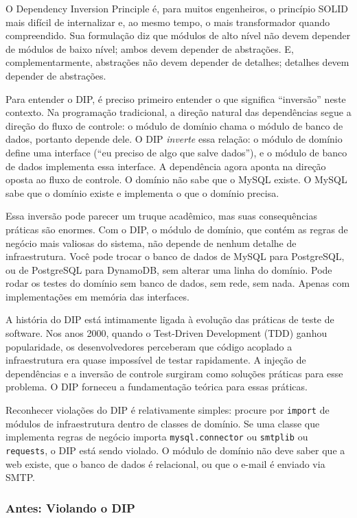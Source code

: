 O Dependency Inversion Principle é, para muitos engenheiros, o princípio SOLID
mais difícil de internalizar e, ao mesmo tempo, o mais transformador quando
compreendido. Sua formulação diz que módulos de alto nível não devem
depender de módulos de baixo nível; ambos devem depender de abstrações. E,
complementarmente, abstrações não devem depender de detalhes; detalhes devem
depender de abstrações.

Para entender o DIP, é preciso primeiro entender o que significa ``inversão''
neste contexto. Na programação tradicional, a direção natural das dependências
segue a direção do fluxo de controle: o módulo de domínio chama o módulo de
banco de dados, portanto depende dele. O DIP \emph{inverte} essa relação: o
módulo de domínio define uma interface (``eu preciso de algo que salve dados''),
e o módulo de banco de dados implementa essa interface. A dependência agora
aponta na direção oposta ao fluxo de controle. O domínio não sabe que o MySQL
existe. O MySQL sabe que o domínio existe e implementa o que o domínio precisa.

Essa inversão pode parecer um truque acadêmico, mas suas consequências
práticas são enormes. Com o DIP, o módulo de domínio, que contém as regras
de negócio mais valiosas do sistema, não depende de nenhum detalhe de
infraestrutura. Você pode trocar o banco de dados de MySQL para PostgreSQL,
ou de PostgreSQL para DynamoDB, sem alterar uma linha do domínio. Pode rodar
os testes do domínio sem banco de dados, sem rede, sem nada. Apenas com
implementações em memória das interfaces.

A história do DIP está intimamente ligada à evolução das práticas de teste
de software. Nos anos 2000, quando o Test-Driven Development (TDD) ganhou
popularidade, os desenvolvedores perceberam que código acoplado a
infraestrutura era quase impossível de testar rapidamente. A injeção de
dependências e a inversão de controle surgiram como soluções práticas para
esse problema. O DIP forneceu a fundamentação teórica para essas práticas.

Reconhecer violações do DIP é relativamente simples: procure por
\texttt{import} de módulos de infraestrutura dentro de classes de domínio.
Se uma classe que implementa regras de negócio importa \texttt{mysql.connector}
ou \texttt{smtplib} ou \texttt{requests}, o DIP está sendo violado. O módulo
de domínio não deve saber que a web existe, que o banco de dados é relacional,
ou que o e-mail é enviado via SMTP.

\subsubsection{Antes: Violando o DIP}


